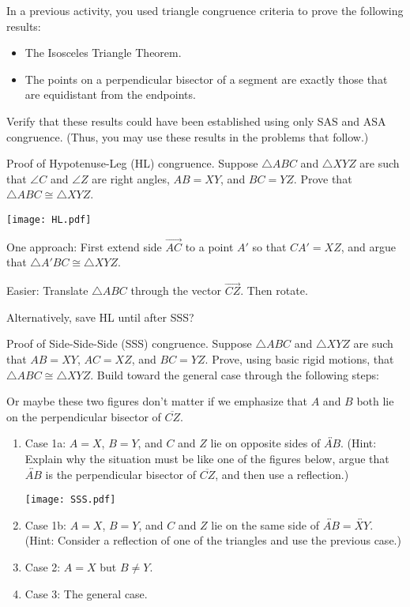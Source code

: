 \documentclass[nooutcomes]{ximera}
\begin{document}
\begin{problem}
In a previous activity, you used triangle congruence criteria to prove the following results: 
\begin{itemize}
\item The Isosceles Triangle Theorem.
\item The points on a perpendicular bisector of a segment are exactly those that are equidistant from the endpoints.
\end{itemize}
Verify that these results could have been established using only SAS and ASA congruence.  (Thus, you may use these results in the problems that follow.) 
\end{problem}

\begin{problem}
Proof of Hypotenuse-Leg (HL) congruence.  Suppose $\triangle ABC$ and $\triangle XYZ$ are such that $\angle C$ and $\angle Z$ are right angles, $AB=XY$, and $BC=YZ$.  Prove that $\triangle ABC \cong \triangle XYZ$.  
\begin{image}
\texttt{[image: HL.pdf]}
\end{image}
\end{problem}

\begin{teachingnote}
One approach:  First extend side $\overrightarrow{AC}$ to a point $A'$ so that $CA'=XZ$, and argue that $\triangle A'BC \cong \triangle XYZ$.

Easier:  Translate $\triangle ABC$ through the vector $\overrightarrow{CZ}$.  Then rotate.

Alternatively, save HL until after SSS?
\end{teachingnote}


\begin{problem}
Proof of Side-Side-Side (SSS) congruence.  Suppose $\triangle ABC$ and $\triangle XYZ$ are such that $AB=XY$, $AC=XZ$, and $BC=YZ$.  Prove, using basic rigid motions, that $\triangle ABC \cong \triangle XYZ$.  Build toward the general case through the following steps:  
\begin{teachingnote}
Or maybe these two figures don't matter if we emphasize that $A$ and $B$ both lie on the perpendicular bisector of $\overline{CZ}$.
\end{teachingnote}
\begin{enumerate}
\item Case 1a:  $A=X$, $B=Y$, and $C$ and $Z$ lie on opposite sides of $\overleftrightarrow{AB}$.  (Hint:  Explain why the situation must be like one of the figures below, argue that $\overleftrightarrow{AB}$ is the perpendicular bisector of $\overline{CZ}$, and then use a reflection.)
\begin{image}
\texttt{[image: SSS.pdf]}
\end{image}
\item Case 1b:  $A=X$, $B=Y$, and $C$ and $Z$ lie on the same side of $\overleftrightarrow{AB}=\overleftrightarrow{XY}$.  (Hint: Consider a reflection of one of the triangles and use the previous case.)  
\item Case 2:  $A=X$ but $B \ne Y$.
\item Case 3: The general case.  
\end{enumerate}
\end{problem}
\end{document}
